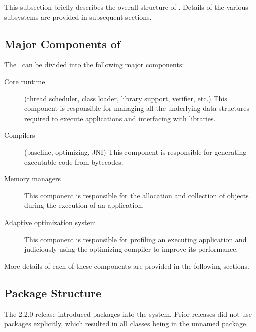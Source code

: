 This subsection briefly describes the overall structure of \jrvm.
Details of the various subsystems are provided in subsequent
sections.  

\subsection{Major Components of \jrvm}


The \jrvm\ can be divided into the following major components:
\begin{description}
\item [Core runtime] (thread scheduler, class loader, library support,
verifier, etc.) This component is responsible for 
managing all the underlying data
structures required to execute applications and interfacing with
libraries.

\item [Compilers] (baseline, optimizing, JNI) This component is
responsible for generating executable code from bytecodes.

\item [Memory managers] This component is responsible for the
allocation and collection of objects during the execution of an
application. 

\item [Adaptive optimization system] This component is responsible
for profiling an executing application
and judiciously using the optimizing compiler to
improve its performance.
\end{description}

More details of each of these components are provided in the following sections.

\subsection{Package Structure}
The 2.2.0 release introduced packages into the system.  Prior releases
did not use packages explicitly, which resulted in all classes being in
the unnamed package.  

